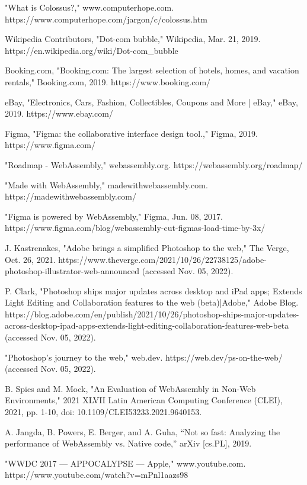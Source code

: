 \begin{thebibliography}{9}
"What is Colossus?," www.computerhope.com. https://www.computerhope.com/jargon/c/colossus.htm

Wikipedia Contributors, "Dot-com bubble," Wikipedia, Mar. 21, 2019. https://en.wikipedia.org/wiki/Dot-com\_bubble

Booking.com, "Booking.com: The largest selection of hotels, homes, and vacation rentals," Booking.com, 2019. https://www.booking.com/

eBay, "Electronics, Cars, Fashion, Collectibles, Coupons and More | eBay," eBay, 2019. https://www.ebay.com/

Figma, "Figma: the collaborative interface design tool.," Figma, 2019. https://www.figma.com/

"Roadmap - WebAssembly," webassembly.org. https://webassembly.org/roadmap/

"Made with WebAssembly," madewithwebassembly.com. https://madewithwebassembly.com/

"Figma is powered by WebAssembly," Figma, Jun. 08, 2017. https://www.figma.com/blog/webassembly-cut-figmas-load-time-by-3x/

J. Kastrenakes, "Adobe brings a simplified Photoshop to the web," The Verge, Oct. 26, 2021. https://www.theverge.com/2021/10/26/22738125/adobe-photoshop-illustrator-web-announced (accessed Nov. 05, 2022).

P. Clark, "Photoshop ships major updates across desktop and iPad apps; Extends Light Editing and Collaboration features to the web (beta)|Adobe," Adobe Blog. https://blog.adobe.com/en/publish/2021/10/26/photoshop-ships-major-updates-across-desktop-ipad-apps-extends-light-editing-collaboration-features-web-beta (accessed Nov. 05, 2022).

"Photoshop’s journey to the web," web.dev. https://web.dev/ps-on-the-web/ (accessed Nov. 05, 2022).

B. Spies and M. Mock, "An Evaluation of WebAssembly in Non-Web Environments," 2021 XLVII Latin American Computing Conference (CLEI), 2021, pp. 1-10, doi: 10.1109/CLEI53233.2021.9640153.

A. Jangda, B. Powers, E. Berger, and A. Guha, “Not so fast: Analyzing the performance of WebAssembly vs. Native code,” arXiv [cs.PL], 2019.

"WWDC 2017 — APPOCALYPSE — Apple," www.youtube.com. https://www.youtube.com/watch?v=mPnl1aazs98


\end{thebibliography}
